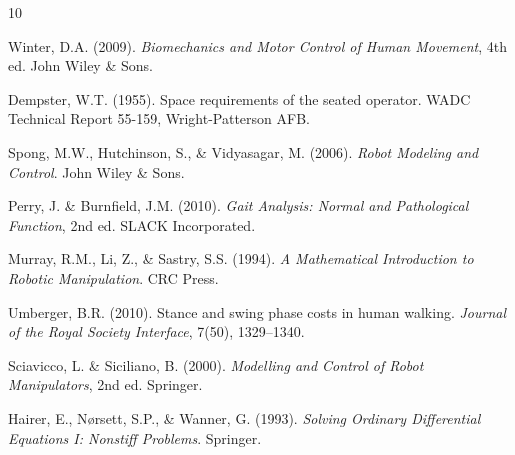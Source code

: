 \documentclass[11pt,a4paper]{article}
\begin{document}
\begin{thebibliography}{10}

Winter, D.A. (2009).
\textit{Biomechanics and Motor Control of Human Movement}, 4th ed.
John Wiley \& Sons.

Dempster, W.T. (1955).
Space requirements of the seated operator.
WADC Technical Report 55-159, Wright-Patterson AFB.

Spong, M.W., Hutchinson, S., \& Vidyasagar, M. (2006).
\textit{Robot Modeling and Control}.
John Wiley \& Sons.

Perry, J. \& Burnfield, J.M. (2010).
\textit{Gait Analysis: Normal and Pathological Function}, 2nd ed.
SLACK Incorporated.

Murray, R.M., Li, Z., \& Sastry, S.S. (1994).
\textit{A Mathematical Introduction to Robotic Manipulation}.
CRC Press.

Umberger, B.R. (2010).
Stance and swing phase costs in human walking.
\textit{Journal of the Royal Society Interface}, 7(50), 1329--1340.

Sciavicco, L. \& Siciliano, B. (2000).
\textit{Modelling and Control of Robot Manipulators}, 2nd ed.
Springer.

Hairer, E., N{\o}rsett, S.P., \& Wanner, G. (1993).
\textit{Solving Ordinary Differential Equations I: Nonstiff Problems}.
Springer.

\end{thebibliography}
\end{document}

